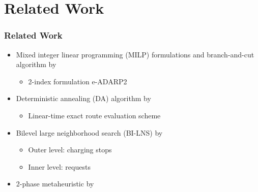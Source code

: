 \documentclass[aspectratio=1610]{beamer}
\begin{document}
\section{Related Work}

\begin{frame}
  \frametitle{Related Work}
  	
\medskip
\begin{itemize}
	\item Mixed integer linear programming (MILP) formulations and branch-and-cut algorithm by \cite{Bongiovanni:2019} 
		\begin{itemize}
			\item 2-index formulation e-ADARP2 
		\end{itemize}
	\smallskip
	\item Deterministic annealing (DA) algorithm by \cite{Su:2023}
		\begin{itemize}
			\item Linear-time exact route evaluation scheme %
		\end{itemize}
	\smallskip
	\item Bilevel large neighborhood search (BI-LNS) by \cite{Limmer:2023}
		\begin{itemize}
			\item Outer level: charging stops 
			\item Inner level: requests 
		\end{itemize}
\end{itemize}

\bigskip

\medskip
\begin{itemize}
	\item 2-phase metaheuristic by \cite{Bongiovanni:2022}
\end{itemize}
  
\end{frame}
\end{document}

